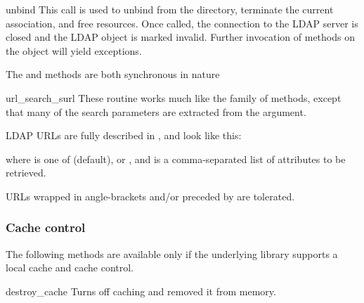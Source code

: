 
\begin{methoddesc}[int]{unbind}{}
This call is used to unbind from the directory, terminate the current
association, and free resources. Once called, the connection to the
LDAP server is closed and the LDAP object is marked invalid.
Further invocation of methods on the object will yield exceptions.

The  and  methods are both
synchronous in nature
\end{methoddesc}


\begin{methoddesc}[LDAP]{url_search_s}{url }
These routine works much like the  family of methods, 
except that many of the search parameters are extracted from the 
argument.

LDAP URLs are fully described in , and look like this: 


where  is one of  (default),  or ,
and  is a comma-separated list of attributes to be retrieved.

URLs wrapped in angle-brackets and/or preceded by  are 
tolerated.
\end{methoddesc}

\subsubsection{Cache control}

The following methods are available only if the underlying library
supports a local cache and cache control.


\begin{methoddesc}[LDAP]{destroy_cache}{}
Turns off caching and removed it from memory.
\end{methoddesc}

